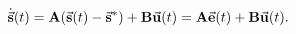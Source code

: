 \documentclass[
    crop,
    margin=0.05in,
    convert={density=150}
]{standalone}
\begin{document}
    $\displaystyle
        \dot{\va{s}}(t) = \vb{A}(\va{s}(t) - \va{s}^*) + \vb{B}\va{u}(t) = \vb{A}\va{e}(t) + \vb{B}\va{u}(t).
    $
\end{document}
